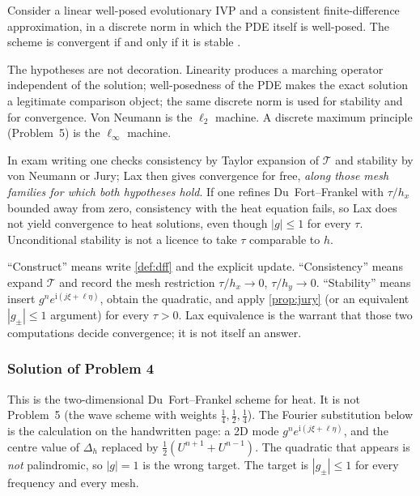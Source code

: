 \begin{theorem}
\label{thm:lax-eq}
Consider a linear well-posed evolutionary IVP and a consistent finite-difference approximation, in a discrete norm in which the PDE itself is well-posed. The scheme is convergent if and only if it is stable \cite{laxrichtmyer56,leveque07}.
\end{theorem}

The hypotheses are not decoration. Linearity produces a marching operator independent of the solution; well-posedness of the PDE makes the exact solution a legitimate comparison object; the same discrete norm is used for stability and for convergence. Von Neumann is the \(\ell_2\) machine. A discrete maximum principle (Problem~5) is the \(\ell_\infty\) machine.

In exam writing one checks consistency by Taylor expansion of \(\mathcal T\) and stability by von Neumann or Jury; Lax then gives convergence for free, \emph{along those mesh families for which both hypotheses hold}. If one refines Du~Fort--Frankel with \(\tau/h_x\) bounded away from zero, consistency with the heat equation fails, so Lax does not yield convergence to heat solutions, even though \(|g|\le 1\) for every \(\tau\). Unconditional stability is not a licence to take \(\tau\) comparable to \(h\).

\begin{remark}
\label{rem:p4-script}
``Construct'' means write \cref{def:dff} and the explicit update. ``Consistency'' means expand \(\mathcal T\) and record the mesh restriction \(\tau/h_x\to 0\), \(\tau/h_y\to 0\). ``Stability'' means insert \(g^n e^{\mathrm i(j\xi+\ell\eta)}\), obtain the quadratic, and apply \cref{prop:jury} (or an equivalent \(|g_\pm|\le 1\) argument) for every \(\tau>0\). Lax equivalence is the warrant that those two computations decide convergence; it is not itself an answer.
\end{remark}

\subsubsection{Solution of Problem 4}

This is the two-dimensional Du~Fort--Frankel scheme for heat. It is not Problem~5 (the wave scheme with weights \(\frac14,\frac12,\frac14\)). The Fourier substitution below is the calculation on the handwritten page: a 2D mode \(g^n e^{\mathrm i(j\xi+\ell\eta)}\), and the centre value of \(\Delta_h\) replaced by \(\frac12(U^{n+1}+U^{n-1})\). The quadratic that appears is \emph{not} palindromic, so \(|g|=1\) is the wrong target. The target is \(|g_\pm|\le 1\) for every frequency and every mesh.

